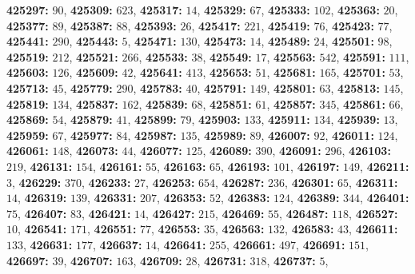 \textsf{\bfseries 425297:} $90$, \textsf{\bfseries 425309:} $623$, \textsf{\bfseries 425317:} $14$, \textsf{\bfseries 425329:} $67$, \textsf{\bfseries 425333:} $102$, \textsf{\bfseries 425363:} $20$, \textsf{\bfseries 425377:} $89$, \textsf{\bfseries 425387:} $88$, \textsf{\bfseries 425393:} $26$, \textsf{\bfseries 425417:} $221$, \textsf{\bfseries 425419:} $76$, \textsf{\bfseries 425423:} $77$, \textsf{\bfseries 425441:} $290$, \textsf{\bfseries 425443:} $5$, \textsf{\bfseries 425471:} $130$, \textsf{\bfseries 425473:} $14$, \textsf{\bfseries 425489:} $24$, \textsf{\bfseries 425501:} $98$, \textsf{\bfseries 425519:} $212$, \textsf{\bfseries 425521:} $266$, \textsf{\bfseries 425533:} $38$, \textsf{\bfseries 425549:} $17$, \textsf{\bfseries 425563:} $542$, \textsf{\bfseries 425591:} $111$, \textsf{\bfseries 425603:} $126$, \textsf{\bfseries 425609:} $42$, \textsf{\bfseries 425641:} $413$, \textsf{\bfseries 425653:} $51$, \textsf{\bfseries 425681:} $165$, \textsf{\bfseries 425701:} $53$, \textsf{\bfseries 425713:} $45$, \textsf{\bfseries 425779:} $290$, \textsf{\bfseries 425783:} $40$, \textsf{\bfseries 425791:} $149$, \textsf{\bfseries 425801:} $63$, \textsf{\bfseries 425813:} $145$, \textsf{\bfseries 425819:} $134$, \textsf{\bfseries 425837:} $162$, \textsf{\bfseries 425839:} $68$, \textsf{\bfseries 425851:} $61$, \textsf{\bfseries 425857:} $345$, \textsf{\bfseries 425861:} $66$, \textsf{\bfseries 425869:} $54$, \textsf{\bfseries 425879:} $41$, \textsf{\bfseries 425899:} $79$, \textsf{\bfseries 425903:} $133$, \textsf{\bfseries 425911:} $134$, \textsf{\bfseries 425939:} $13$, \textsf{\bfseries 425959:} $67$, \textsf{\bfseries 425977:} $84$, \textsf{\bfseries 425987:} $135$, \textsf{\bfseries 425989:} $89$, \textsf{\bfseries 426007:} $92$, \textsf{\bfseries 426011:} $124$, \textsf{\bfseries 426061:} $148$, \textsf{\bfseries 426073:} $44$, \textsf{\bfseries 426077:} $125$, \textsf{\bfseries 426089:} $390$, \textsf{\bfseries 426091:} $296$, \textsf{\bfseries 426103:} $219$, \textsf{\bfseries 426131:} $154$, \textsf{\bfseries 426161:} $55$, \textsf{\bfseries 426163:} $65$, \textsf{\bfseries 426193:} $101$, \textsf{\bfseries 426197:} $149$, \textsf{\bfseries 426211:} $3$, \textsf{\bfseries 426229:} $370$, \textsf{\bfseries 426233:} $27$, \textsf{\bfseries 426253:} $654$, \textsf{\bfseries 426287:} $236$, \textsf{\bfseries 426301:} $65$, \textsf{\bfseries 426311:} $14$, \textsf{\bfseries 426319:} $139$, \textsf{\bfseries 426331:} $207$, \textsf{\bfseries 426353:} $52$, \textsf{\bfseries 426383:} $124$, \textsf{\bfseries 426389:} $344$, \textsf{\bfseries 426401:} $75$, \textsf{\bfseries 426407:} $83$, \textsf{\bfseries 426421:} $14$, \textsf{\bfseries 426427:} $215$, \textsf{\bfseries 426469:} $55$, \textsf{\bfseries 426487:} $118$, \textsf{\bfseries 426527:} $10$, \textsf{\bfseries 426541:} $171$, \textsf{\bfseries 426551:} $77$, \textsf{\bfseries 426553:} $35$, \textsf{\bfseries 426563:} $132$, \textsf{\bfseries 426583:} $43$, \textsf{\bfseries 426611:} $133$, \textsf{\bfseries 426631:} $177$, \textsf{\bfseries 426637:} $14$, \textsf{\bfseries 426641:} $255$, \textsf{\bfseries 426661:} $497$, \textsf{\bfseries 426691:} $151$, \textsf{\bfseries 426697:} $39$, \textsf{\bfseries 426707:} $163$, \textsf{\bfseries 426709:} $28$, \textsf{\bfseries 426731:} $318$, \textsf{\bfseries 426737:} $5$, 
